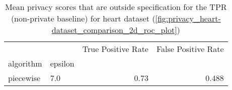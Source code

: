\begin{table}[H]

    \begin{tabularx}{0.8\textwidth}{llrr}
        \toprule
                  &         & True Positive Rate & False Positive Rate \\
        algorithm & epsilon &                    &                     \\
        \midrule
        piecewise & 7.0     & 0.73               & 0.488               \\
        \bottomrule
    \end{tabularx}
    \caption{Mean privacy scores that are outside specification for the TPR (non-private baseline) for heart dataset (\ref{fig:privacy_heart-dataset_comparison_2d_roc_plot})}

\end{table}
